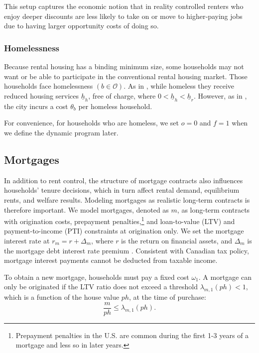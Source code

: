 \documentclass[parskip=full]{article}
\begin{document}
This setup captures the economic notion that in reality controlled renters who enjoy deeper discounts are less likely to take on or move to higher‑paying jobs due to having larger opportunity costs of doing so.

\subsubsection{Homelessness}\label{sec:cohabit_homeless}

Because rental housing has a binding minimum size, some households may not want or be able to participate in the conventional rental housing market. Those households face homelessness $\left(b \in \mathcal{O}\right)$. As in \citet{az-2024}, while homeless they receive reduced housing services $\underline{h}_{h}$, free of charge, where $0<\underline{h}_{h}<\underline{h}_{r}$. However, as in \citet{abramson-2024}, the city incurs a cost $\theta_{b}$ per homeless household. 

For convenience, for households who are homeless, we set $o=0$ and $f=1$ when we define the dynamic program later.

\subsection{Mortgages}\label{subsection:morgtages}

In addition to rent control, the structure of mortgage contracts also influences households' tenure decisions, which in turn affect rental demand, equilibrium rents, and welfare results. Modeling mortgages as realistic long-term contracts is therefore important. We model mortgages, denoted as $m$, as long-term contracts with origination costs, prepayment penalties,\footnote{Prepayment penalties in the U.S. are common during the first 1-3 years of a mortgage and less so in later years.} and loan-to-value (LTV) and payment-to-income (PTI) constraints at origination only. We set the mortgage interest rate at $r_{m}=r+\Delta_m$, where $r$ is the return on financial assets, and $\Delta_m$ is the mortgage debt interest rate premium \citep{sommeretal-2013,sommersullivan-2017,kaplanetal-2019}. Consistent with Canadian tax policy, mortgage interest payments cannot be deducted from taxable income.

To obtain a new mortgage, households must pay a fixed cost $\omega_{1}$. A mortgage can only be originated if the LTV ratio does not exceed a threshold $\lambda_{m,1}(ph)<1$, which is a function of the house value $ph$, at the time of purchase:
\begin{equation}\label{eq:LTV}
\frac{m}{p h} \leq \lambda_{m,1}(ph).
\end{equation}
\end{document}
